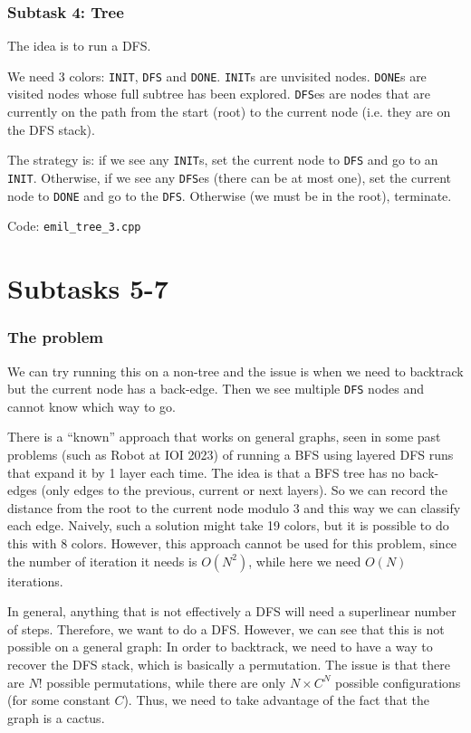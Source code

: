 \documentclass{article}
\begin{document}
\section{Subtask 4: Tree}

The idea is to run a DFS.

We need 3 colors: \verb|INIT|, \verb|DFS| and \verb|DONE|.
\verb|INIT|s are unvisited nodes. \verb|DONE|s are visited nodes whose full subtree has been explored. \verb|DFS|es are nodes that are currently on the path from the start (root) to the current node (i.e. they are on the DFS stack).

The strategy is: if we see any \verb|INIT|s, set the current node to \verb|DFS| and go to an \verb|INIT|. Otherwise, if we see any \verb|DFS|es (there can be at most one), set the current node to \verb|DONE| and go to the \verb|DFS|. Otherwise (we must be in the root), terminate.

Code: \verb|emil_tree_3.cpp|

\part{Subtasks 5-7}

\section{The problem}

We can try running this on a non-tree and the issue is when we need to backtrack but the current node has a back-edge. Then we see multiple \verb|DFS| nodes and cannot know which way to go.

There is a ``known'' approach that works on general graphs, seen in some past problems (such as Robot at IOI 2023) of running a BFS using layered DFS runs that expand it by 1 layer each time. The idea is that a BFS tree has no back-edges (only edges to the previous, current or next layers). So we can record the distance from the root to the current node modulo 3 and this way we can classify each edge. Naively, such a solution might take 19 colors, but it is possible to do this with 8 colors. However, this approach cannot be used for this problem, since the number of iteration it needs is $O(N^2)$, while here we need $O(N)$ iterations.

In general, anything that is not effectively a DFS will need a superlinear number of steps. Therefore, we want to do a DFS. However, we can see that this is not possible on a general graph: In order to backtrack, we need to have a way to recover the DFS stack, which is basically a permutation. The issue is that there are $N!$ possible permutations, while there are only $N \times C^N$ possible configurations (for some constant $C$). Thus, we need to take advantage of the fact that the graph is a cactus.
\end{document}
